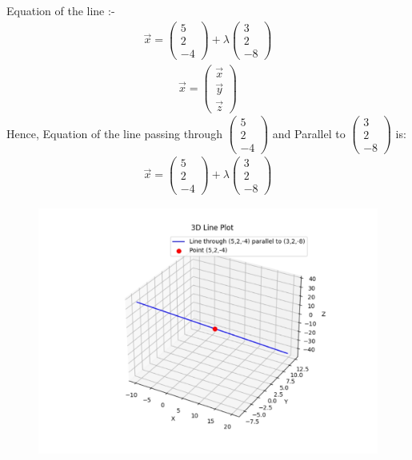 \documentclass[journal]{IEEEtran}
\begin{document}
Equation of the line :-
\begin{align}
\vec{x} = \begin{pmatrix}5 \\2 \\-4\end{pmatrix} + \lambda \begin{pmatrix}3 \\2 \\-8\end{pmatrix}
\end{align}
\begin{align}
\vec{x}= \begin{pmatrix}\vec{x} \\\vec{y} \\\vec{z}\end{pmatrix}
\end{align}
Hence, Equation of the line passing through $\begin{pmatrix}5 \\2 \\-4\end{pmatrix}$ and Parallel to $\begin{pmatrix}3 \\2 \\-8\end{pmatrix}$ is:\\
\begin{align*}
\vec{x} = \begin{pmatrix}5 \\2 \\-4\end{pmatrix} + \lambda \begin{pmatrix}3 \\2 \\-8\end{pmatrix}
\end{align*}

\begin{figure}[H]
    \centering
    \includegraphics[width=0.8\columnwidth]{figs/line.jpg}
    \caption{}
    \label{fig:LINE}
\end{figure}
\end{document}
